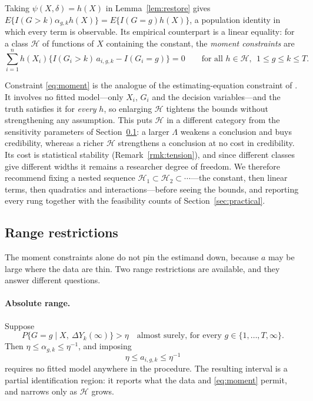 \documentclass[12pt]{article}
\theoremstyle{remark}
\begin{document}
Taking $\psi(X,\delta) = h(X)$ in Lemma~\ref{lem:restore} gives
$E\{I(G{>}k)\alpha_{g,k}h(X)\} = E\{I(G{=}g)h(X)\}$, a population identity in which every
term is observable. Its empirical counterpart is a linear equality: for a class
$\mathcal{H}$ of functions of $X$ containing the constant, the \emph{moment constraints}
are
\begin{equation}
\sum_{i=1}^{n} h(X_i)\big\{ I(G_i > k)\, a_{i,g,k} - I(G_i = g) \big\} = 0
\qquad \text{for all } h \in \mathcal{H},\ \ 1 \le g \le k \le T.
\label{eq:moment}
\end{equation}

Constraint \eqref{eq:moment} is the analogue of the estimating-equation constraint of
\citet{tang2025simple}. It involves no fitted model---only $X_i$, $G_i$ and the decision
variables---and the truth satisfies it for \emph{every} $h$, so enlarging $\mathcal{H}$
tightens the bounds without strengthening any assumption. This puts $\mathcal{H}$ in a
different category from the sensitivity parameters of Section~\ref{sec:range}: a larger
$\Lambda$ weakens a conclusion and buys credibility, whereas a richer $\mathcal{H}$
strengthens a conclusion at no cost in credibility. Its cost is statistical stability
(Remark~\ref{rmk:tension}), and since different classes give different widths it remains a
researcher degree of freedom. We therefore recommend fixing a nested sequence
$\mathcal{H}_1 \subset \mathcal{H}_2 \subset \cdots$---the constant, then linear terms,
then quadratics and interactions---before seeing the bounds, and reporting every rung
together with the feasibility counts of Section~\ref{sec:practical}.

\subsection{Range restrictions}
\label{sec:range}

The moment constraints alone do not pin the estimand down, because $a$ may be large where
the data are thin. Two range restrictions are available, and they answer different
questions.

\paragraph{Absolute range.} Suppose
\begin{equation}
P\{G = g \mid X,\ \Delta Y_k(\infty)\} > \eta \quad\text{almost surely, for every }
g \in \{1,\ldots,T,\infty\}.
\label{eq:latentpos}
\end{equation}
Then $\eta \le \alpha_{g,k} \le \eta^{-1}$, and imposing
\begin{equation}
\eta \le a_{i,g,k} \le \eta^{-1}
\label{eq:etabox}
\end{equation}
requires no fitted model anywhere in the procedure. The resulting interval is a partial
identification region: it reports what the data and \eqref{eq:moment} permit, and narrows
only as $\mathcal{H}$ grows.
\end{document}
